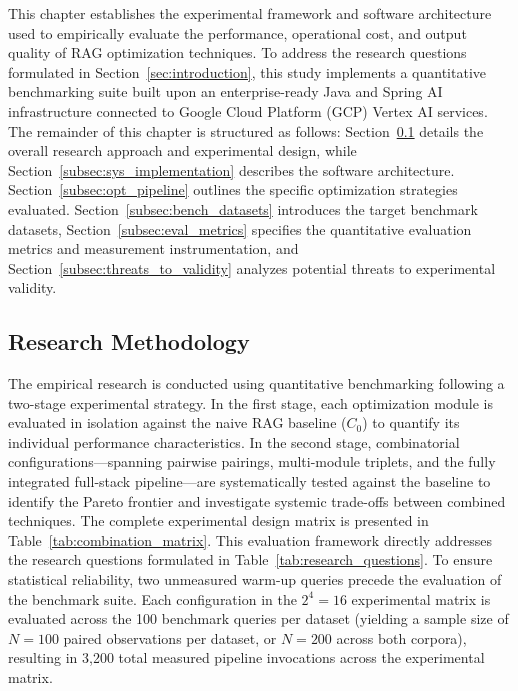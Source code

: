 This chapter establishes the experimental framework and software architecture used to empirically evaluate the performance, operational cost, and output quality of RAG optimization techniques. To address the research questions formulated in Section~\ref{sec:introduction}, this study implements a quantitative benchmarking suite built upon an enterprise-ready Java and Spring AI infrastructure connected to Google Cloud Platform (GCP) Vertex AI services. The remainder of this chapter is structured as follows: Section~\ref{subsec:res_methodology} details the overall research approach and experimental design, while Section~\ref{subsec:sys_implementation} describes the software architecture. Section~\ref{subsec:opt_pipeline} outlines the specific optimization strategies evaluated. Section~\ref{subsec:bench_datasets} introduces the target benchmark datasets,
Section~\ref{subsec:eval_metrics} specifies the quantitative evaluation metrics and measurement instrumentation, and Section~\ref{subsec:threats_to_validity} analyzes potential threats to experimental validity.

\subsection{Research Methodology}
\label{subsec:res_methodology}

The empirical research is conducted using quantitative benchmarking following a two-stage experimental strategy. In the first stage, each optimization module is evaluated in isolation against the naive RAG baseline ($C_0$) to quantify its individual performance characteristics. In the second stage, combinatorial configurations---spanning pairwise pairings, multi-module triplets, and the fully integrated full-stack pipeline---are systematically tested against the baseline to identify the Pareto frontier and investigate systemic trade-offs between combined techniques. The complete experimental design matrix is presented in Table~\ref{tab:combination_matrix}. This evaluation framework directly addresses the research questions formulated in Table~\ref{tab:research_questions}. To ensure statistical reliability, two unmeasured warm-up queries precede the evaluation of the benchmark suite. Each configuration in the $2^4 = 16$ experimental matrix is evaluated across the 100 benchmark queries per dataset (yielding a sample size of $N = 100$ paired observations per dataset, or $N = 200$ across both corpora), resulting in 3,200 total measured pipeline invocations across the experimental matrix.

